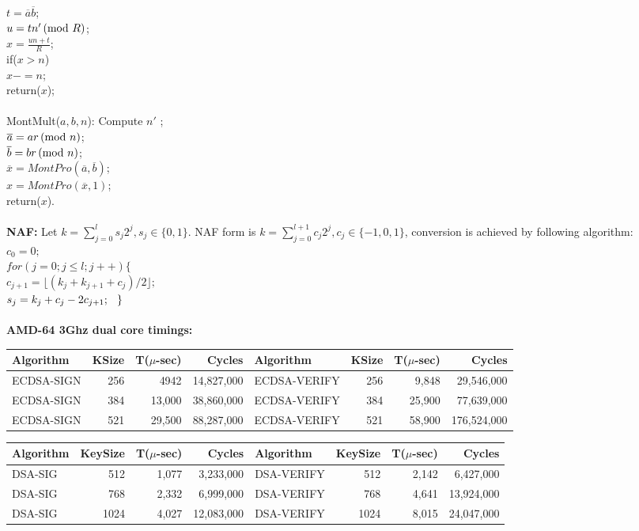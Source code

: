 \jt \jt $t= {\overline a} {\overline b}$; \\
\jt \jt $u= tn' \thinspace \textnormal{(mod } R \textnormal{)}$; \\
\jt \jt $x= {\frac {un+t} R}$; \\
\jt \jt if($x>n$)  \\
\jt \jt \jt $x-=n$; \\
\jt \jt return($x$); \\
\\
\jt MontMult($a,b,n$): Compute $n'$ ;\\
\jt \jt ${\overline a}= a r \thinspace \textnormal{(mod } n \textnormal{)}$;\\
\jt \jt ${\overline b}= b r \thinspace \textnormal{(mod } n \textnormal{)}$;\\
\jt \jt ${\overline x}= MontPro({\overline a}, {\overline b})$;\\
\jt \jt $x= MontPro({\overline x}, 1)$;\\
\jt \jt return($x$).
\\
\\
{\bf NAF: } Let $k= \sum_{j=0}^l s_j 2^j, s_j \in \{0, 1\}$. NAF form is
$k= \sum_{j=0}^{l+1} c_j 2^j, c_j \in \{-1, 0, 1\}$, conversion is achieved
by following algorithm:\\
\jt $c_0 =0;$\\
\jt $for(j=0; j \le l; j++) \{$\\
\jt \jt $c_{j+1}= \lfloor (k_j + k_{j+1} +c_j) /2 \rfloor;$ \\
\jt \jt $s_{j}= k_j + c_j -2 c_{j+1}; \\
\hspace*{.25cm} \}$
\\
\\
{\bf AMD-64 3Ghz dual core timings: }
\begin{center}
\begin{tabular} {|l|rrr||l|rrr|}
\hline
{\bf Algorithm} & {\bf KSize} & {\bf T($\mu$-sec)} & {\bf Cycles} &
{\bf Algorithm} & {\bf KSize} & {\bf T($\mu$-sec)} & {\bf Cycles} \\
\hline
ECDSA-SIGN & 256 & 4942 & 14,827,000 &
ECDSA-VERIFY & 256 & 9,848 & 29,546,000 \\
ECDSA-SIGN & 384 & 13,000 & 38,860,000 &
ECDSA-VERIFY & 384 & 25,900 & 77,639,000 \\
ECDSA-SIGN & 521 & 29,500 & 88,287,000 &
ECDSA-VERIFY & 521 & 58,900 & 176,524,000 \\
\hline
\end{tabular}
\end{center}
\begin{center}
\begin{tabular} {|l|rrr||l|rrr|}
\hline
{\bf Algorithm} & {\bf KeySize} & {\bf T($\mu$-sec)} & {\bf Cycles} &
{\bf Algorithm} & {\bf KeySize} & {\bf T($\mu$-sec)} & {\bf Cycles} \\
\hline
DSA-SIG & 512 & 1,077 & 3,233,000 &
DSA-VERIFY & 512 & 2,142 & 6,427,000 \\
DSA-SIG	& 768 & 2,332 & 6,999,000 &
DSA-VERIFY & 768 & 4,641 & 13,924,000 \\
DSA-SIG	& 1024	& 4,027 & 12,083,000 &
DSA-VERIFY	& 1024 & 8,015 & 24,047,000 \\
\hline
\end{tabular}
\end{center}
